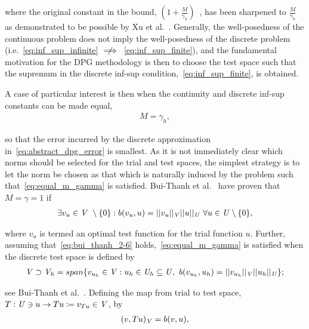 where the original constant in the bound, $\left( 1 + \frac{M}{\gamma_h} \right)$~\cite[eq. ()]{Babuska1971}, has been
sharpened to $\frac{M}{\gamma_h}$ as demonstrated to be possible by Xu et al.~\cite[Theorem ]{Xu2003}.
Generally, the well-posedness of the continuous problem does not imply the well-posedness of the discrete problem
(i.e.~\eqref{eq:inf_sup_infinite} $\centernot\implies$~\eqref{eq:inf_sup_finite}), and the fundamental motivation for
the DPG methodology is then to choose the test space such that the supremum in the discrete inf-sup
condition,~\eqref{eq:inf_sup_finite}, is obtained. 

A case of particular interest is then when the continuity and discrete inf-sup constants can be made equal,
\begin{align} \label{eq:equal_m_gamma}
M = \gamma_h,
\end{align}

so that the error incurred by the discrete approximation in~\eqref{eq:abstract_dpg_error} is smallest. As it is not
immediately clear which norms should be selected for the trial and test spaces, the simplest strategy is to let the norm
be chosen as that which is naturally induced by the problem such that~\eqref{eq:equal_m_gamma} is satisfied. Bui-Thanh
et al.~\cite[Theorem ]{BuiThanh2013} have proven that $M = \gamma = 1$ if
\begin{align} \label{eq:bui_thanh_2-6}
\exists v_u \in \mathit{{{V}}}\ \setminus \{0\} :
b(v_u,u) = ||v_u||_{\mathit{{{V}}}} ||u||_{\mathit{{{U}}}}\ \forall u \in \mathit{{{U}}} \setminus \{0\},
\end{align}

where $v_u$ is termed an optimal test function for the trial function $u$. Further, assuming
that~\eqref{eq:bui_thanh_2-6} holds,~\eqref{eq:equal_m_gamma} is satisfied when the discrete test space is defined by
\begin{align} \label{eq:def_discrete_test_space}
\mathit{{{V}}} \supset \mathit{{{V}}}_h 
= span \{ v_{u_h} \in \mathit{{{V}}} : u_h \in \mathit{{{U}}}_h \subseteq \mathit{{{U}}},\ b(v_{u_h},u_h) 
= ||v_{u_h}||_{\mathit{{{V}}}} ||u_h||_{\mathit{{{U}}}} \};
\end{align}

see Bui-Thanh et al.~\cite[Lemma ]{BuiThanh2013}. Defining the map from trial to test space, $T :
\mathit{{{U}}} \ni u \rightarrow Tu \coloneqq v_{Tu} \in \mathit{{{V}}} $, by
\begin{align}
(v,Tu)_{\mathit{{{V}}}} = b(v,u),
\end{align}

